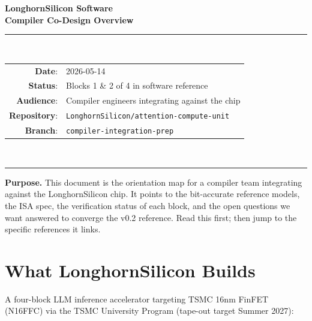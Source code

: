 \documentclass[11pt]{article}
\begin{document}
\thispagestyle{empty}
\begin{center}
\vspace*{1.2in}
{\Huge\bfseries LonghornSilicon Software}\\[0.4em]
{\LARGE\bfseries Compiler Co-Design Overview}\\[1.5em]

\rule{0.7\textwidth}{0.4pt}\\[1em]

\begin{tabular}{rl}
\textbf{Date}:           & 2026-05-14 \\
\textbf{Status}:         & Blocks 1 \& 2 of 4 in software reference \\
\textbf{Audience}:       & Compiler engineers integrating against the chip \\
\textbf{Repository}:     & \texttt{LonghornSilicon/attention-compute-unit} \\
\textbf{Branch}:         & \texttt{compiler-integration-prep} \\
\end{tabular}\\[1em]
\rule{0.7\textwidth}{0.4pt}

\vfill
\begin{minipage}{0.85\textwidth}
\small
\textbf{Purpose.} This document is the orientation map for a compiler
team integrating against the LonghornSilicon chip. It points to the
bit-accurate reference models, the ISA spec, the verification status
of each block, and the open questions we want answered to converge
the v0.2 reference. Read this first; then jump to the specific
references it links.
\end{minipage}

\vspace{0.3in}
\end{center}

\clearpage

\tableofcontents
\clearpage

\section{What LonghornSilicon Builds}
\label{sec:what}

A four-block LLM inference accelerator targeting TSMC 16nm FinFET (N16FFC) via the
TSMC University Program (tape-out target Summer 2027):
\end{document}
